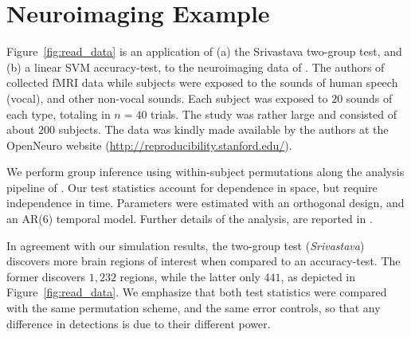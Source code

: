\documentclass[oupdraft]{bio}
\begin{document}
\section{Neuroimaging Example}
\label{sec:example}

Figure~\ref{fig:read_data} is an application of (a) the Srivastava two-group test, and (b) a linear SVM accuracy-test, to the neuroimaging data of \citet{pernet_human_2015}. 
The authors of \cite{pernet_human_2015} collected fMRI data while subjects were exposed to the sounds of human speech (vocal), and other non-vocal sounds. 
Each subject was exposed to $20$ sounds of each type, totaling in $n=40$ trials.
The study was rather large and consisted of about $200$ subjects.
The data was kindly made available by the authors at the OpenNeuro website (\url{http://reproducibility.stanford.edu/}).

We perform group inference using within-subject permutations along the analysis pipeline of \cite{stelzer_statistical_2013}. 
Our test statistics account for dependence in space, but require independence in time. 
Parameters were estimated with an orthogonal design, and an AR(6) temporal model.
Further details of the analysis, are reported in \cite{gilron_quantifying_2016}. 

In agreement with our simulation results, the two-group test (\emph{Srivastava}) discovers more brain regions of interest when compared to an accuracy-test.
The former discovers $1,232$ regions, while the latter only $441$, as depicted in Figure~\ref{fig:read_data}.
We emphasize that both test statistics were compared with the same permutation scheme, and the same error controls, so that any difference in detections is due to their different power.
\end{document}
